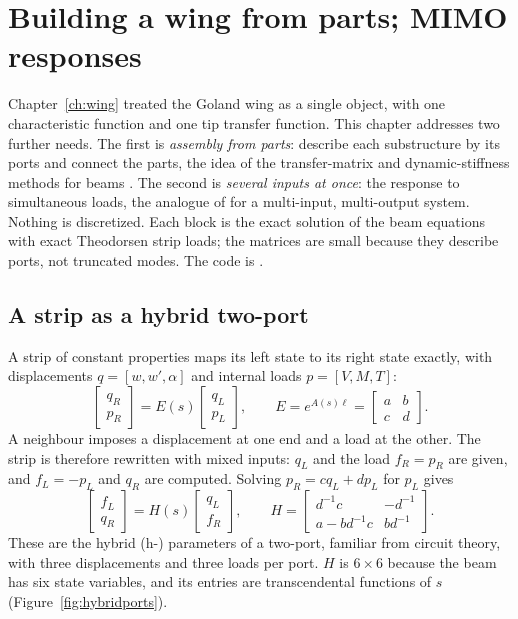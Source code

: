 \chapter{Building a wing from parts; MIMO responses}\label{ch:hybrid}

Chapter~\ref{ch:wing} treated the Goland wing as a single object, with
one characteristic function and one tip transfer function. This chapter
addresses two further needs. The first is \emph{assembly from parts}:
describe each substructure by its ports and connect the parts, the idea
of the transfer-matrix and dynamic-stiffness methods for beams
\citep{banerjee2016}. The second is \emph{several inputs at once}: the
response to simultaneous loads, the analogue of  for a
multi-input, multi-output system. Nothing is discretized. Each block is
the exact solution of the beam equations with exact Theodorsen strip
loads; the matrices are small because they describe ports, not truncated
modes. The code is .

\section{A strip as a hybrid two-port}

A strip of constant properties maps its left state to its right state
exactly, with displacements $q=[w,w',\alpha]$ and internal loads
$p=[V,M,T]$:
\begin{equation}
 \begin{bmatrix}q_R\\p_R\end{bmatrix}
 =E(s)\begin{bmatrix}q_L\\p_L\end{bmatrix},\qquad
 E=e^{A(s)\ell}=\begin{bmatrix}a&b\\c&d\end{bmatrix}.
\end{equation}
A neighbour imposes a displacement at one end and a load at the other.
The strip is therefore rewritten with mixed inputs: $q_L$ and the load
$f_R=p_R$ are given, and $f_L=-p_L$ and $q_R$ are computed. Solving
$p_R=cq_L+dp_L$ for $p_L$ gives
\begin{equation}\label{eq:hybridports}
 \begin{bmatrix}f_L\\q_R\end{bmatrix}
 =H(s)\begin{bmatrix}q_L\\f_R\end{bmatrix},\qquad
 H=\begin{bmatrix}d^{-1}c&-d^{-1}\\a-bd^{-1}c&bd^{-1}\end{bmatrix}.
\end{equation}
These are the hybrid (h-) parameters of a two-port, familiar from circuit
theory, with three displacements and three loads per port. $H$ is
$6\times6$ because the beam has six state variables, and its entries are
transcendental functions of $s$ (Figure~\ref{fig:hybridports}).

